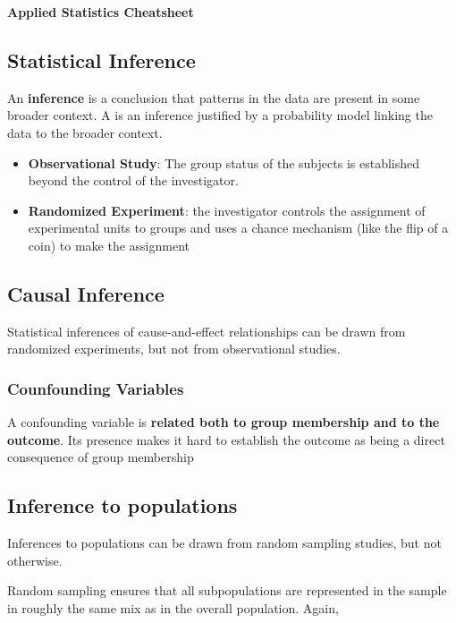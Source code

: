 \documentclass[10pt,landscape, fleqn]{article}
\begin{document}
	\raggedright
	\footnotesize
		
	\begin{center}
		\Large{\textbf{Applied Statistics Cheatsheet}} \\
	\end{center}
	\begin{multicols}{3}
		\setlength{\premulticols}{1pt}
		\setlength{\postmulticols}{1pt}
		\setlength{\multicolsep}{1pt}
		\setlength{\columnsep}{2pt}
		\section{Statistical Inference}
			An \textbf{inference} is a conclusion that patterns in the data are present in some broader context.
			A  is an inference justified by a probability model linking the data to the broader context.
			\begin{itemize}
				\item \textbf{Observational Study}: The group status of the subjects is established beyond the control of the investigator.
				\item \textbf{Randomized Experiment}: the investigator controls the assignment of experimental units to groups and uses a chance mechanism (like the flip of a coin) to make the assignment
			\end{itemize}
			\subsection{Causal Inference}
				Statistical inferences of cause-and-effect relationships can be drawn 	from randomized experiments, but not from observational studies.
				\subsubsection{Counfounding Variables} 
				A confounding variable is \textbf{related both to group membership and to the outcome}. Its presence makes it hard to establish the outcome as being a direct consequence of group membership
			\subsection{Inference to populations}
				Inferences to populations can be drawn from random sampling	studies, but not otherwise.\par 
				Random sampling ensures that all subpopulations are represented in the sample in roughly the same mix as in the overall population. Again,

\end{multicols}
\end{document}

